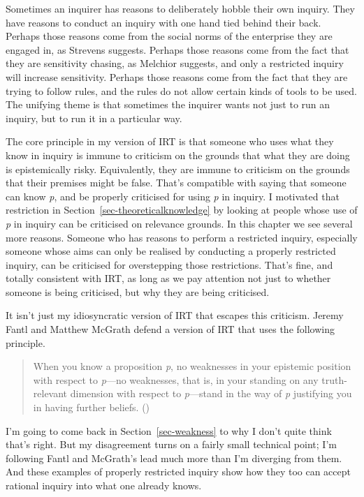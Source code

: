\documentclass[
  12pt,
  letterpaper,
]{scrbook}
\begin{document}
Sometimes an inquirer has reasons to deliberately hobble their own
inquiry. They have reasons to conduct an inquiry with one hand tied
behind their back. Perhaps those reasons come from the social norms of
the enterprise they are engaged in, as Strevens suggests. Perhaps those
reasons come from the fact that they are sensitivity chasing, as
Melchior suggests, and only a restricted inquiry will increase
sensitivity. Perhaps those reasons come from the fact that they are
trying to follow rules, and the rules do not allow certain kinds of
tools to be used. The unifying theme is that sometimes the inquirer
wants not just to run an inquiry, but to run it in a particular way.

The core principle in my version of IRT is that someone who uses what
they know in inquiry is immune to criticism on the grounds that what
they are doing is epistemically risky. Equivalently, they are immune to
criticism on the grounds that their premises might be false. That's
compatible with saying that someone can know \emph{p}, and be properly
criticised for using \emph{p} in inquiry. I motivated that restriction
in Section~\ref{sec-theoreticalknowledge} by looking at people whose use
of \emph{p} in inquiry can be criticised on relevance grounds. In this
chapter we see several more reasons. Someone who has reasons to perform
a restricted inquiry, especially someone whose aims can only be realised
by conducting a properly restricted inquiry, can be criticised for
overstepping those restrictions. That's fine, and totally consistent
with IRT, as long as we pay attention not just to whether someone is
being criticised, but why they are being criticised.

It isn't just my idiosyncratic version of IRT that escapes this
criticism. Jeremy Fantl and Matthew McGrath defend a version of IRT that
uses the following principle.

\begin{quote}
When you know a proposition \emph{p}, no weaknesses in your epistemic
position with respect to \emph{p}---no weaknesses, that is, in your
standing on any truth-relevant dimension with respect to
\emph{p}---stand in the way of \emph{p} justifying you in having further
beliefs. ()
\end{quote}

I'm going to come back in Section~\ref{sec-weakness} to why I don't
quite think that's right. But my disagreement turns on a fairly small
technical point; I'm following Fantl and McGrath's lead much more than
I'm diverging from them. And these examples of properly restricted
inquiry show how they too can accept rational inquiry into what one
already knows.
\end{document}
